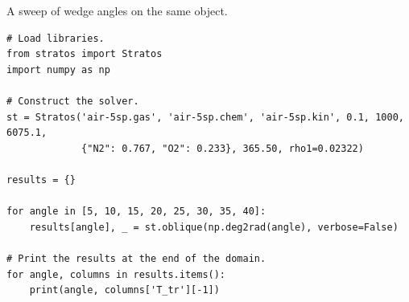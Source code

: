 \documentclass[10pt,a4paper]{article}
\renewcommand{\_}{\origunderscore\penalty4000\relax}
\begin{document}
A sweep of wedge angles on the same object.

\begin{lstlisting}
# Load libraries.
from stratos import Stratos
import numpy as np

# Construct the solver.
st = Stratos('air-5sp.gas', 'air-5sp.chem', 'air-5sp.kin', 0.1, 1000, 6075.1,
             {"N2": 0.767, "O2": 0.233}, 365.50, rho1=0.02322)

results = {}

for angle in [5, 10, 15, 20, 25, 30, 35, 40]:
    results[angle], _ = st.oblique(np.deg2rad(angle), verbose=False)

# Print the results at the end of the domain.
for angle, columns in results.items():
    print(angle, columns['T_tr'][-1])
\end{lstlisting}
\end{document}
